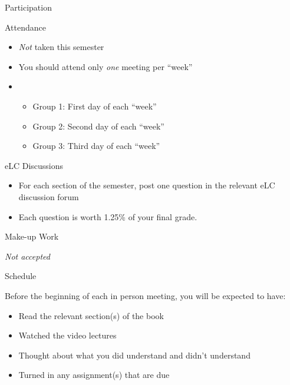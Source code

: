 \documentclass{beamer}
\begin{document}
    \begin{frame}{Participation}
      \begin{block}{Attendance}
        \begin{itemize}
          \item \emph{Not} taken this semester
          \item You should attend only \emph{one} meeting per ``week''
          \item
          \begin{itemize}
            \item Group 1: First day of each ``week''
            \item Group 2: Second day of each ``week''
            \item Group 3: Third day of each ``week''
          \end{itemize}
        \end{itemize}
      \end{block}
      \begin{block}{eLC Discussions}
        \begin{itemize}
          \item For each section of the semester, post one question in the relevant eLC discussion forum
          \item Each question is worth 1.25\% of your final grade.
        \end{itemize}
      \end{block}
    \end{frame}

    \begin{frame}{Make-up Work}
      \begin{block}{}
        \emph{Not accepted}
      \end{block}
    \end{frame}

    \begin{frame}{Schedule}
      \begin{block}{}
        Before the beginning of each in person meeting, you will be expected to have:
        \begin{itemize}
          \item Read the relevant section(s) of the book
          \item Watched the video lectures
          \item Thought about what you did understand and didn't understand
          \item Turned in any assignment(s) that are due
        \end{itemize}
      \end{block}
    \end{frame}
\end{document}

